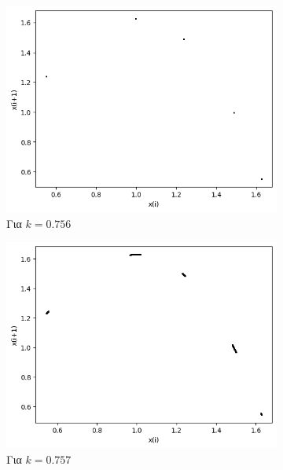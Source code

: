 \begin{figure}[ht]
\begin{subfigure}[b]{0.4\textwidth}
		\includegraphics[width=\textwidth]{LateX images/graphs q14/g21}
		\caption{Για $k=0.756$}
		\label{f:k78}
	\end{subfigure}
	\hfill
	\begin{subfigure}[b]{0.4\textwidth}
		\centering
		\includegraphics[width=\textwidth]{LateX images/graphs q14/g22}
		\caption{Για $k=0.757$}
		\label{f:k79}
	\end{subfigure}
	\hfill	
	\begin{subfigure}[b]{0.4\textwidth}
		\centering

\end{subfigure}
\end{figure}
